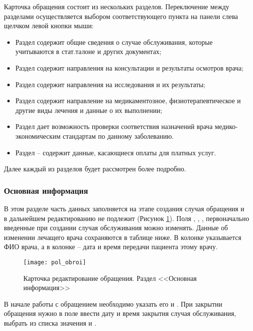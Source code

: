 Карточка обращения состоит из нескольких разделов. Переключение между разделами осуществляется выбором соответствующего пункта на панели слева щелчком левой кнопки мыши:
\begin{itemize}
 \item Раздел  содержит общие сведения о случае обслуживания, которые учитываются в стат.талоне и других документах;
 \item Раздел  содержит направления на консультации и результаты осмотров врача;
 \item Раздел  содержит направления на исследования и их результаты;
 \item Раздел  содержит направление на медикаментозное, физиотерапевтическое и другие виды лечения и данные о их выполнении;
 \item Раздел  дает возможность проверки соответствия назначений врача медико-экономическим стандартам по данному заболеванию.
 \item Раздел  – содержит данные, касающиеся оплаты для платных услуг.
\end{itemize}
 
Далее каждый из разделов будет рассмотрен более подробно.

\subsubsection{Основная информация}

В этом разделе часть данных заполняется на этапе создания случая обращения и в дальнейшем редактированию не подлежит (Рисунок \ref{img_pol_obroi}). Поля , , , первоначально введенные при создании случая обслуживания можно изменять. Данные об изменении лечащего врача сохраняются в таблице ниже. В колонке  указывается ФИО врача, а в колонке  – дата и время передачи пациента этому врачу.

\begin{figure}[ht]\centering
 \texttt{[image: pol\_obroi]}
 \caption{Карточка редактирование обращения. Раздел <<Основная информация>>}
 \label{img_pol_obroi}
\end{figure}

В начале работы с обращением необходимо указать его  и . При закрытии обращения нужно в поле  ввести дату и время закрытия случая обслуживания, выбрать из списка значения  и .

